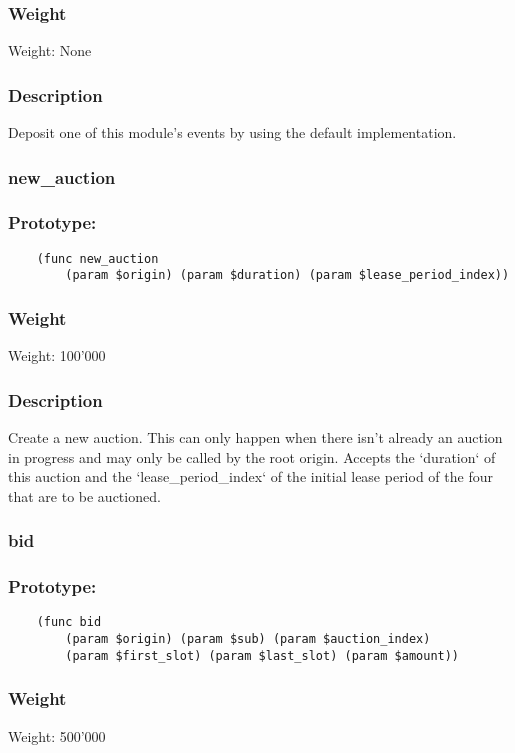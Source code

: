 \documentclass[11pt,a4paper]{article}
\begin{document}
\subsubsection*{Weight}
Weight: None
\subsubsection*{Description}
Deposit one of this module's events by using the default implementation.

\subsubsection{new\_auction}
\subsubsection*{Prototype:}
\begin{verbatim}
    (func new_auction
        (param $origin) (param $duration) (param $lease_period_index))
\end{verbatim}
\subsubsection*{Weight}
Weight: 100'000
\subsubsection*{Description}
Create a new auction. This can only happen when there isn't already an auction in progress and may only be called by the root origin. Accepts the `duration` of this auction and the `lease\_period\_index` of the initial lease period of the four that are to be auctioned.

\subsubsection{bid}
\subsubsection*{Prototype:}
\begin{verbatim}
    (func bid 
        (param $origin) (param $sub) (param $auction_index)
        (param $first_slot) (param $last_slot) (param $amount))
\end{verbatim}
\subsubsection*{Weight}
Weight: 500'000
\end{document}
